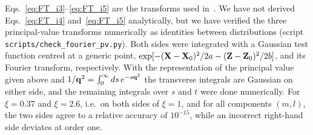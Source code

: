 Eqs.~\eqref{eq:FT_i3}--\eqref{eq:FT_i5} are the transforms used in~\cite{Lublinsky:2016meo,Radhakrishnan:2026soft}. We have not derived Eqs.~\eqref{eq:FT_i4} and~\eqref{eq:FT_i5} analytically, but we have verified the three principal-value transforms numerically as identities between distributions (script \texttt{scripts/check\_fourier\_pv.py}). Both sides were integrated with a Gaussian test function centred at a generic point, $\exp[-(\mathbf{X}-\mathbf{X}_0)^2/2a-(\mathbf{Z}-\mathbf{Z}_0)^2/2b]$, and its Fourier transform, respectively. With the representation of the principal value given above and $1/\mathbf{q}^2=\int_0^\infty ds\,e^{-s\mathbf{q}^2}$ the transverse integrals are Gaussian on either side, and the remaining integrals over $s$ and $t$ were done numerically. For $\xi=0.37$ and $\xi=2.6$, i.e.\ on both sides of $\xi=1$, and for all components $(m,l)$, the two sides agree to a relative accuracy of $10^{-15}$, while an incorrect right-hand side deviates at order one.
